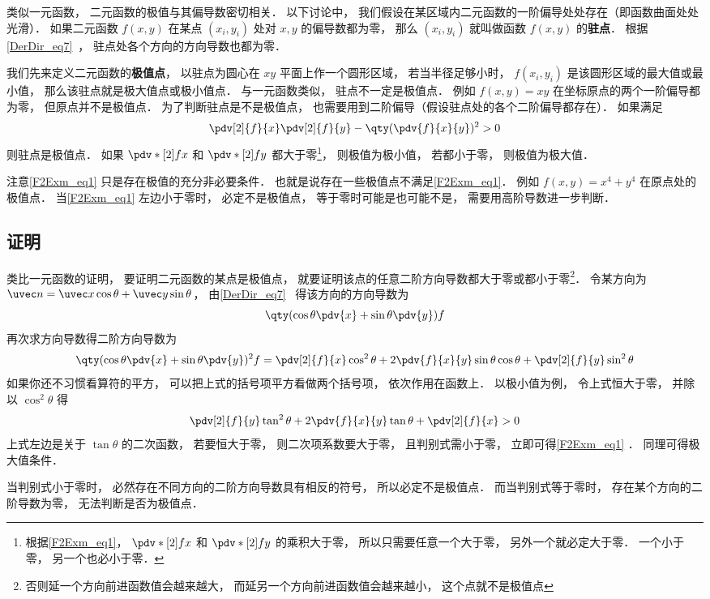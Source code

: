 
类似一元函数， 二元函数的极值与其偏导数密切相关． 以下讨论中， 我们假设在某区域内二元函数的一阶偏导处处存在（即函数曲面处处光滑）． 如果二元函数 $f(x,y)$ 在某点 $(x_i, y_i)$ 处对 $x, y$ 的偏导数都为零， 那么 $(x_i, y_i)$ 就叫做函数 $f(x,y)$ 的\textbf{驻点}． 根据\autoref{DerDir_eq7}~， 驻点处各个方向的方向导数也都为零．

我们先来定义二元函数的\textbf{极值点}， 以驻点为圆心在 $xy$ 平面上作一个圆形区域， 若当半径足够小时， $f(x_i, y_i)$ 是该圆形区域的最大值或最小值， 那么该驻点就是极大值点或极小值点． 与一元函数类似， 驻点不一定是极值点． 例如 $f(x,y) = xy$ 在坐标原点的两个一阶偏导都为零， 但原点并不是极值点． 为了判断驻点是不是极值点， 也需要用到二阶偏导（假设驻点处的各个二阶偏导都存在）． 如果满足
\begin{equation}\label{F2Exm_eq1}
\pdv[2]{f}{x}\pdv[2]{f}{y} - \qty(\pdv{f}{x}{y})^2 > 0
\end{equation}
则驻点是极值点． 如果 $\pdv*[2]{f}{x}$ 和 $\pdv*[2]{f}{y}$ 都大于零\footnote{根据\autoref{F2Exm_eq1}， $\pdv*[2]{f}{x}$ 和 $\pdv*[2]{f}{y}$ 的乘积大于零， 所以只需要任意一个大于零， 另外一个就必定大于零． 一个小于零， 另一个也必小于零．}， 则极值为极小值， 若都小于零， 则极值为极大值．

注意\autoref{F2Exm_eq1} 只是存在极值的充分非必要条件． 也就是说存在一些极值点不满足\autoref{F2Exm_eq1}． 例如 $f(x, y) = x^4 + y^4$ 在原点处的极值点． 当\autoref{F2Exm_eq1} 左边小于零时， 必定不是极值点， 等于零时可能是也可能不是， 需要用高阶导数进一步判断．

\subsection{证明}

类比一元函数的证明， 要证明二元函数的某点是极值点， 就要证明该点的任意二阶方向导数都大于零或都小于零\footnote{否则延一个方向前进函数值会越来越大， 而延另一个方向前进函数值会越来越小， 这个点就不是极值点}． 令某方向为 $\uvec n = \uvec x \cos\theta + \uvec y \sin\theta$， 由\autoref{DerDir_eq7}~ 得该方向的方向导数为
\begin{equation}
\qty(\cos\theta\pdv{x} + \sin\theta\pdv{y}) f
\end{equation}
再次求方向导数得二阶方向导数为
\begin{equation}
\qty(\cos\theta\pdv{x} + \sin\theta\pdv{y})^2 f
= \pdv[2]{f}{x} \cos^2\theta + 2\pdv{f}{x}{y} \sin\theta\cos\theta + \pdv[2]{f}{y} \sin^2\theta
\end{equation}
如果你还不习惯看算符的平方， 可以把上式的括号项平方看做两个括号项， 依次作用在函数上． 以极小值为例， 令上式恒大于零， 并除以 $\cos^2\theta$ 得
\begin{equation}
\pdv[2]{f}{y} \tan^2\theta + 2\pdv{f}{x}{y} \tan\theta + \pdv[2]{f}{x} > 0
\end{equation}
上式左边是关于 $\tan\theta$ 的二次函数， 若要恒大于零， 则二次项系数要大于零， 且判别式需小于零， 立即可得\autoref{F2Exm_eq1} ． 同理可得极大值条件．

当判别式小于零时， 必然存在不同方向的二阶方向导数具有相反的符号， 所以必定不是极值点． 而当判别式等于零时， 存在某个方向的二阶导数为零， 无法判断是否为极值点．
